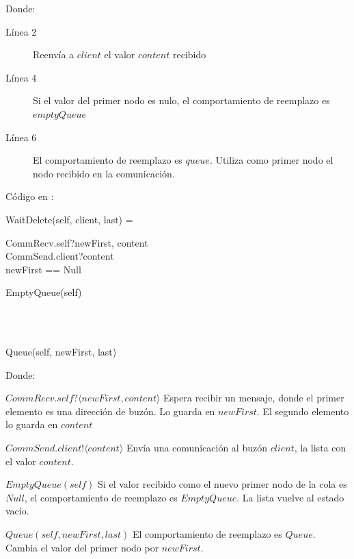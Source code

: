 Donde: 

\begin{description}
 \item [Línea 2] Reenvía a $client$ el valor $content$ recibido
 \item [Línea 4] Si el valor del primer nodo es nulo, el comportamiento de reemplazo es $emptyQueue$
 \item [Línea 6] El comportamiento de reemplazo es $queue$. Utiliza como primer nodo el nodo recibido en la comunicación.
\end{description}

Código en \CSP:

\begin{process}
WaitDelete(self, client, last) = \\ \quad
  \begin{block}
  CommRecv.self?\langle newFirst, content \rangle \then \\ 
  CommSend.client?\langle content \rangle \then \\ 
  \If newFirst == Null \Then \\ \quad
    \begin{block}
      EmptyQueue(self)
    \end{block} \\ 
  \Then \\ \quad
    \begin{block}
    Queue(self, newFirst, last)
    \end{block}
  \end{block} 
\end{process}

Donde:

\begin{description}
 \item $CommRecv.self?\langle newFirst, content \rangle$ Espera recibir un mensaje, donde el primer elemento es una dirección de buzón. Lo guarda en $newFirst$. El segundo elemento lo guarda en $content$
 \item $CommSend.client!\langle content \rangle$ Envía una comunicación al buzón $client$, la lista con el valor $content$. 
 \item $EmptyQueue(self)$ Si el valor recibido como el nuevo primer nodo de la cola es $Null$, el comportamiento de reemplazo es $EmptyQueue$. La lista vuelve al estado vacío.
 \item $Queue(self, newFirst, last)$ El comportamiento de reemplazo es $Queue$. Cambia el valor del primer nodo por $newFirst$.
 \end{description}
 
